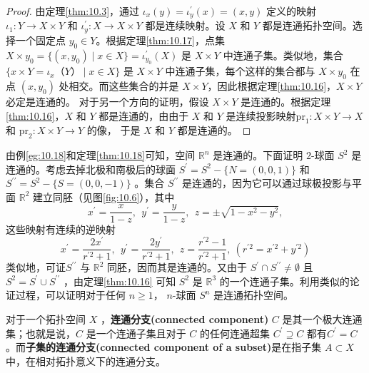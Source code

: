 \begin{proof}
	由定理\ref{thm:10.3}，通过 $\iota _{x}( y) =\iota ^{\prime}_{y}( x) =( x,y)$ 定义的映射 $\iota _{1} :Y\rightarrow X\times Y$ 和 $\iota ^{\prime}_{y} :X\rightarrow X\times Y$ 都是连续映射。设 $X$ 和 $Y$ 都是连通拓扑空间。选择一个固定点 $y_{0} \in Y$。根据定理\ref{thm:10.17}，点集 $X\times y_{0} =\{(x,y_{0} )\mid x\in X\}=\iota ^{\prime}_{y_{0}}( X)$ 是 $X\times Y$ 中连通子集。类似地，集合 $\{x\times Y=\iota _{x} （Y）\mid x\in X\}$ 是 $X\times Y$ 中连通子集，每个这样的集合都与 $X\times y_{0}$ 在点 $(x,y_{0} )$ 处相交。而这些集合的并是 $X\times Y$，因此根据定理\ref{thm:10.16}，$X\times Y$ 必定是连通的。
	对于另一个方向的证明，假设 $X\times Y$ 是连通的。根据定理\ref{thm:10.16}，$X$ 和 $Y$ 都是连通的，由由于 $X$ 和 $Y$ 是连续投影映射$\mathrm{pr}_{1} :X\times Y\rightarrow X$ 和 $\mathrm{pr}_{2} :X\times Y\rightarrow Y$ 的像， 于是 $X$ 和 $Y$ 都是连通的。
\end{proof}

\begin{eg}\label{eg:10.19} 
	由例\ref{eg:10.18}和定理\ref{thm:10.18}可知，空间 $\mathbb{R}^{n}$ 是连通的。下面证明 $2$-球面 $S^{2}$ 是连通的。考虑去掉北极和南极后的球面 $S^{\prime}=S^{2} -\{N=(0,0,1)\}$ 和 $S^{\prime \prime}=S^{2} -\{S=(0,0,-1)\}$ 。集合 $S^{\prime \prime}$ 是连通的，因为它可以通过球极投影与平面 $\mathbb{R}^{2}$ 建立同胚（见图\ref{fig:10.6}），其中
\begin{equation*}
x^{\prime}=\frac{x}{1-z} ,\ \ y^{\prime}=\frac{y}{1-z} ,\ \ z=\pm \sqrt{1-x^{2} -y^{2}} ,
\end{equation*}
这些映射有连续的逆映射
\begin{equation*}
x^{\prime}=\frac{2x^{\prime}}{r^{\prime 2} +1} ,\ \ y^{\prime}=\frac{2y^{\prime}}{r^{\prime 2} +1} ,\ \ z=\frac{r^{\prime 2} -1}{r^{\prime 2} +1} ,\ \left( r^{\prime 2} =x^{\prime 2} +y^{\prime 2}\right)
\end{equation*}
类似地，可证$S^{\prime \prime}$ 与 $\mathbb{R}^{2}$ 同胚，因而其是连通的。又由于 $S^{\prime}\cap S^{\prime \prime}\neq \emptyset $ 且 $S^{2} =S^{\prime}\cup S^{\prime \prime}$ ，由定理\ref{thm:10.16} 可知 $S^{2}$ 是 $\mathbb{R}^{3}$ 的一个连通子集。利用类似的论证过程，可以证明对于任何 $n\geq 1$， $n$-球面 $S^{n}$ 是连通拓扑空间。 
\end{eg}

	对于一个拓扑空间 $X$ ，\textbf{连通分支(connected component)} $C$ 是其一个极大连通集；也就是说，$C$ 是一个连通子集且对于 $C$ 的任何连通超集 $C^{\prime}\supseteq C$ 都有$C^{\prime}=C$ 。而\textbf{子集的连通分支(connected component of a subset)}是在指子集 $A\subset X$ 中，在相对拓扑意义下的连通分支。

